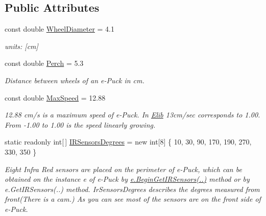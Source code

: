   


  


  \subsection*{Public Attributes}
  \begin{DoxyCompactItemize}
  \item 
  const double \hyperlink{class_elib_1_1_epuck_afef1fb969494d5992aaac3146c9b3f5f}{WheelDiameter} = 4.1
  \begin{DoxyCompactList}\small\item\em units: \mbox{[}cm\mbox{]} \item\end{DoxyCompactList}\item 
  const double \hyperlink{class_elib_1_1_epuck_a07d37f0deafd97a37fcea3c667ae3984}{Perch} = 5.3
  \begin{DoxyCompactList}\small\item\em Distance between wheels of an e-\/Puck in cm. \item\end{DoxyCompactList}\item 
  const double \hyperlink{class_elib_1_1_epuck_a1c5722494d807e6a5df5835c722d4d6e}{MaxSpeed} = 12.88
  \begin{DoxyCompactList}\small\item\em 12.88 cm/s is a maximum speed of e-\/Puck. In \hyperlink{namespace_elib}{Elib} 13cm/sec corresponds to 1.00. From -\/1.00 to 1.00 is the speed linearly growing. \item\end{DoxyCompactList}
  \item static readonly int\mbox{[}$\,$\mbox{]} \hyperlink{class_elib_1_1_epuck_ab1705fc7b8cacf430c8060ee9c0b5d93}{IRSensorsDegrees} = new int\mbox{[}8\mbox{]} \{ 10, 30, 90, 170, 190, 270, 330, 350 \}
  \begin{DoxyCompactList}\small\item\em Eight Infra Red sensors are placed on the perimeter of e-\/Puck, which can be obtained on the instance e of e-\/Puck by \hyperlink{}{e.BeginGetIRSensors(..)} method or by {\ttfamily e.GetIRSensors(..)} method. IrSensorsDegrees describes the degrees measured from front(There is a cam.) As you can see most of the sensors are on the front side of e-\/Puck. \item\end{DoxyCompactList}\end{DoxyCompactItemize}

